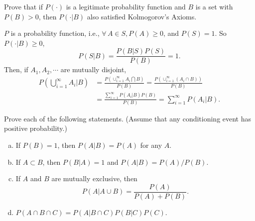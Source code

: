 \documentclass[14pt]{elegantbook}
\begin{document}
    \setcounter{exer}{34}
    \begin{exercise}
        Prove that if $P(\cdot)$ is a legitimate probability function and $B$ is a set with $P(B)>0$, then $P(\cdot|B)$ also satisfied Kolmogorov's Axioms. 
    \end{exercise}

    \begin{solution}
        $P$ is a probability function, i.e., $\forall\,A\in S, P(A)\geq 0$, and $P(S)=1$. So $P(\cdot|B)\geq0$,
        \[
            P(S|B)=\frac{P(B|S)P(S)}{P(B)}=1. 
        \]
        Then, if $A_1, A_2, \cdots$ are mutually disjoint, 
        \begin{align*}
            P\left(\bigcup_{i=1}^\infty A_i\big|B\right)&=\frac{P\left(\cup_{i=1}^\infty A_i \bigcap B\right)}{P(B)}=\frac{P(\cup_{i=1}^\infty(A_i\cap B))}{P(B)}\\
            &=\frac{\sum_{i=1}^\infty P(A_i|B)P(B)}{P(B)}=\sum_{i=1}^\infty P(A_i|B). 
        \end{align*}
    \end{solution}

    \setcounter{exer}{37}
    \begin{exercise}
        Prove each of the following statements. (Assume that any conditioning event has positive probability.)
        \begin{enumerate}[(a)]
            \item If $P(B)=1$, then $P(A|B)=P(A)$ for any $A$. 
            \item If $A\subset B$, then $P(B|A)=1$ and $P(A|B)=P(A)/P(B)$. 
            \item If $A$ and $B$ are mutually exclusive, then \[
                P(A|A\cup B)=\frac{P(A)}{P(A)+P(B)}. 
            \]
            \item $P(A\cap B\cap C)=P(A|B\cap C)P(B|C)P(C)$. 
        \end{enumerate}
    \end{exercise}
\end{document}
